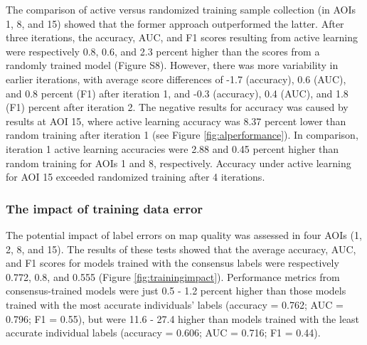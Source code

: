 \documentclass[11pt,a4paper]{article}
\begin{document}
The comparison of active versus randomized training sample collection
(in AOIs 1, 8, and 15) showed that the former approach outperformed the
latter. After three iterations, the accuracy, AUC, and F1 scores
resulting from active learning were respectively 0.8, 0.6, and 2.3
percent higher than the scores from a randomly trained model (Figure
S8). However, there was more variability in earlier iterations, with
average score differences of -1.7 (accuracy), 0.6 (AUC), and 0.8 percent
(F1) after iteration 1, and -0.3 (accuracy), 0.4 (AUC), and 1.8 (F1)
percent after iteration 2. The negative results for accuracy was caused
by results at AOI 15, where active learning accuracy was 8.37 percent
lower than random training after iteration 1 (see Figure
\ref{fig:alperformance}). In comparison, iteration 1 active learning
accuracies were 2.88 and 0.45 percent higher than random training for
AOIs 1 and 8, respectively. Accuracy under active learning for AOI 15
exceeded randomized training after 4 iterations.

\hypertarget{the-impact-of-training-data-error}{%
\subsubsection{The impact of training data
error}\label{the-impact-of-training-data-error}}

The potential impact of label errors on map quality was assessed in four
AOIs (1, 2, 8, and 15). The results of these tests showed that the
average accuracy, AUC, and F1 scores for models trained with the
consensus labels were respectively 0.772, 0.8, and 0.555 (Figure
\ref{fig:trainingimpact}). Performance metrics from consensus-trained
models were just 0.5 - 1.2 percent higher than those models trained with
the most accurate individuals' labels (accuracy = 0.762; AUC = 0.796; F1
= 0.55), but were 11.6 - 27.4 higher than models trained with the least
accurate individual labels (accuracy = 0.606; AUC = 0.716; F1 = 0.44).
\end{document}

